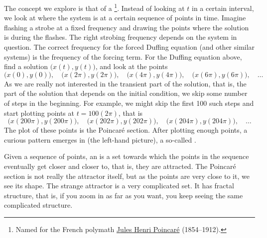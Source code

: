 The concept we explore
is that of a \emph{}%
\footnote{Named for the French polymath
\href{https://en.wikipedia.org/wiki/Henri_Poincar\%C3\%A9}{Jules Henri
Poincar\'e} (1854--1912).}.  Instead of 
looking at $t$ in a certain interval, we look at where the
system is at a certain sequence of points in time.
Imagine flashing a strobe at a
fixed frequency and drawing the points where the solution is during the flashes.
The right strobing frequency
depends on the system in question.
The
correct frequency for the forced Duffing equation (and other similar
systems) is the frequency of the forcing term.
For the Duffing equation above, find a solution
$\bigl(x(t),y(t)\bigr)$, and look at the points
\begin{equation*}
\bigl(x(0),y(0)\bigr), \quad
\bigl(x(2\pi),y(2\pi)\bigr), \quad
\bigl(x(4\pi),y(4\pi)\bigr), \quad
\bigl(x(6\pi),y(6\pi)\bigr), \quad \ldots
\end{equation*}
As we are really not interested in the transient part of the solution, that
is, the part of the solution that depends on the initial condition, we 
skip some number of steps in the beginning.  For example, we might skip the first 100 such
steps and start plotting points at $t = 100(2\pi)$, that is
\begin{equation*}
\bigl(x(200\pi),y(200\pi)\bigr), \quad
\bigl(x(202\pi),y(202\pi)\bigr), \quad
\bigl(x(204\pi),y(204\pi)\bigr), \quad \ldots
\end{equation*}
The plot of these points is the Poincar\'e section.
After plotting enough points, a curious pattern emerges in
 (the left-hand picture), a so-called
\emph{}.

\begin{myfig}
\capstart
\caption{Strange attractor.  The left plot 
is with no phase shift, the right plot has phase shift
$\nicefrac{\pi}{4}$. \label{nlin:strange}}
\end{myfig}

Given a sequence of points, 
an \emph{} is a set towards which the points
in the sequence
eventually get closer and closer to, that is, they are attracted.  The
Poincar\'e section is not really the attractor itself, but as
the points are very close to it, we see its shape.  The strange
attractor is a very complicated set.   It has
fractal structure, that is, if you zoom in as far as you want, you
keep seeing the same complicated structure.

